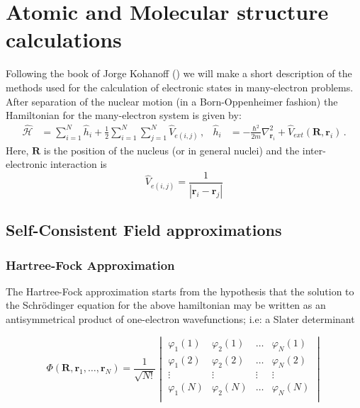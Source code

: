 \chapter{Atomic and Molecular structure calculations}
\label{C:atom-molec-struct}

Following the book of Jorge Kohanoff (\citeyear{Kohanof2006_ESC}) we will make a short description of the methods used for the calculation of electronic states in many-electron problems.
After separation of the nuclear motion (in a Born-Oppenheimer fashion) the Hamiltonian for the many-electron system is given by:
\begin{align}
  \label{Q:Hamil-many-elect}
 \mathcal{\hat{H}}&= \sum_{i=1}^{N} \hat{h}_{i} + \frac{1}{2} \sum_{i=1}^{N}\sum_{j=1}^{N} \hat{V}_{e(i,j)} \,,&
 \hat{h}_{i}&= -\frac{\hbar^{2}}{2 m} \nabla^{2}_{\bm{r}_{i}} + \hat{V}_{ext}(\bm{R},\bm{r}_{i}) \,.
\end{align}
Here, $\bm{R}$ is the position of the nucleus (or in general nuclei) and the inter-electronic interaction is
\begin{equation*}
  \hat{V}_{e(i,j)}= \frac{1}{|\bm{r}_{i}-\bm{r}_{j}|}
\end{equation*}

\section{Self-Consistent Field approximations}
\label{S:self-cons-field}

\subsection{Hartree-Fock Approximation}
\label{S:hartr-fock-appr}

The Hartree-Fock approximation starts from the hypothesis that the solution to the Schr\"{o}dinger equation for the above hamiltonian may be written as an antisymmetrical product of one-electron wavefunctions; i.e: a Slater determinant

\begin{equation*}
  \Phi(\bm{R},\bm{r}_{1},\dots,\bm{r}_{N})= \frac{1}{\sqrt{N!}}
  \begin{vmatrix}
    \varphi_{1}(1) & \varphi_{2}(1) & \dots & \varphi_{N}(1) \\
    \varphi_{1}(2) & \varphi_{2}(2) & \dots & \varphi_{N}(2) \\
    \vdots & \vdots & \vdots & \vdots \\
    \varphi_{1}(N) & \varphi_{2}(N) & \dots & \varphi_{N}(N) \\
  \end{vmatrix}
\end{equation*}


